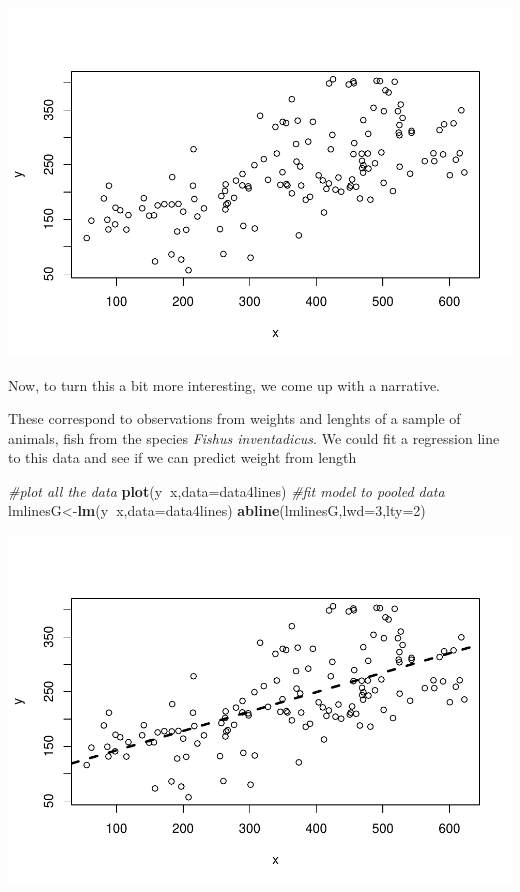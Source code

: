 \documentclass[
]{book}
\newenvironment{Shaded}{\begin{snugshade}}{\end{snugshade}}
\newcommand{\CommentTok}[1]{\textcolor[rgb]{0.56,0.35,0.01}{\textit{#1}}}
\newcommand{\DataTypeTok}[1]{\textcolor[rgb]{0.13,0.29,0.53}{#1}}
\newcommand{\DecValTok}[1]{\textcolor[rgb]{0.00,0.00,0.81}{#1}}
\newcommand{\KeywordTok}[1]{\textcolor[rgb]{0.13,0.29,0.53}{\textbf{#1}}}
\newcommand{\NormalTok}[1]{#1}
\newcommand{\OperatorTok}[1]{\textcolor[rgb]{0.81,0.36,0.00}{\textbf{#1}}}
\begin{document}
\includegraphics{ECOMODbook_files/figure-latex/a7.9-1.pdf}

Now, to turn this a bit more interesting, we come up with a narrative.

These correspond to observations from weights and lenghts of a sample of animals, fish from the species \emph{Fishus inventadicus}. We could fit a regression line to this data and see if we can predict weight from length

\begin{Shaded}
\begin{Highlighting}[]
\CommentTok{#plot all the data}
\KeywordTok{plot}\NormalTok{(y}\OperatorTok{~}\NormalTok{x,}\DataTypeTok{data=}\NormalTok{data4lines)}
\CommentTok{#fit model to pooled data}
\NormalTok{lmlinesG<-}\KeywordTok{lm}\NormalTok{(y}\OperatorTok{~}\NormalTok{x,}\DataTypeTok{data=}\NormalTok{data4lines)}
\KeywordTok{abline}\NormalTok{(lmlinesG,}\DataTypeTok{lwd=}\DecValTok{3}\NormalTok{,}\DataTypeTok{lty=}\DecValTok{2}\NormalTok{)}
\end{Highlighting}
\end{Shaded}

\includegraphics{ECOMODbook_files/figure-latex/a7.10-1.pdf}
\end{document}

